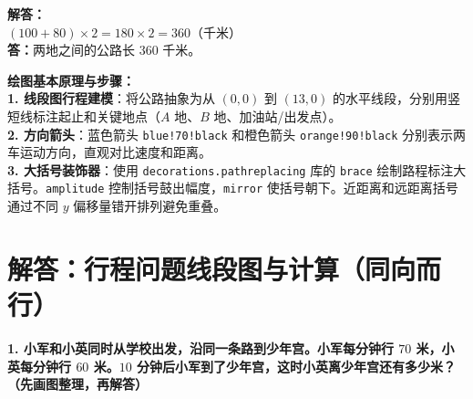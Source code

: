 \documentclass[12pt, a4paper]{ctexrep}
\begin{document}
\vspace{0.6cm}

\noindent
\textbf{解答：}\\
$(100 + 80) \times 2 = 180 \times 2 = 360$（千米）\\[4pt]
\textbf{答：}两地之间的公路长 $360$ 千米。

\vspace{0.6cm}

{\small\color{blue!70!black}
\textbf{绘图基本原理与步骤：}\\
\textbf{1. 线段图行程建模}：将公路抽象为从 $(0,0)$ 到 $(13,0)$ 的水平线段，分别用竖短线标注起止和关键地点（$A$ 地、$B$ 地、加油站/出发点）。\\
\textbf{2. 方向箭头}：蓝色箭头 \texttt{blue!70!black} 和橙色箭头 \texttt{orange!90!black} 分别表示两车运动方向，直观对比速度和距离。\\
\textbf{3. 大括号装饰器}：使用 \texttt{decorations.pathreplacing} 库的 \texttt{brace} 绘制路程标注大括号。\texttt{amplitude} 控制括号鼓出幅度，\texttt{mirror} 使括号朝下。近距离和远距离括号通过不同 $y$ 偏移量错开排列避免重叠。
}

\newpage

\section{解答：行程问题线段图与计算（同向而行）}

\vspace{0.4cm}

\noindent\textbf{1. 小军和小英同时从学校出发，沿同一条路到少年宫。小军每分钟行 $70$ 米，小英每分钟行 $60$ 米。$10$ 分钟后小军到了少年宫，这时小英离少年宫还有多少米？（先画图整理，再解答）}

\vspace{0.8cm}
\end{document}
